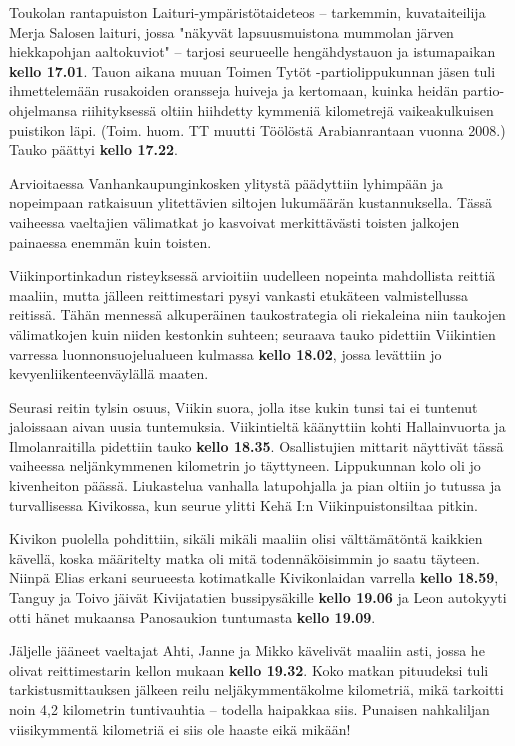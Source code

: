 \documentclass[10pt,finnish,a5paper,headings=small,twoside=semi]{scrartcl}
\begin{document}
\begin{multicols}{2}
	Toukolan rantapuiston Laituri-ympäristötaideteos – tarkemmin,
	kuvataiteilija Merja Salosen laituri, jossa "näkyvät lapsuusmuistona
	mummolan järven hiekkapohjan aaltokuviot" – tarjosi seurueelle
	hengähdystauon ja istumapaikan \textbf{kello 17.01}. Tauon aikana muuan
	Toimen Tytöt -partiolippukunnan jäsen tuli ihmettelemään rusakoiden
	oransseja huiveja ja kertomaan, kuinka heidän partio-ohjelmansa
	riihityksessä oltiin hiihdetty kymmeniä kilometrejä vaikeakulkuisen
	puistikon läpi. (Toim. huom. TT muutti Töölöstä Arabianrantaan vuonna
	2008.) Tauko päättyi \textbf{kello 17.22}.

	Arvioitaessa Vanhankaupunginkosken ylitystä päädyttiin lyhimpään ja
	nopeimpaan ratkaisuun ylitettävien siltojen lukumäärän kustannuksella.
	Tässä vaiheessa vaeltajien välimatkat jo kasvoivat merkittävästi
	toisten jalkojen painaessa enemmän kuin toisten.

	Viikinportinkadun risteyksessä arvioitiin uudelleen nopeinta
	mahdollista reittiä maaliin, mutta jälleen reittimestari pysyi vankasti
	etukäteen valmistellussa reitissä. Tähän mennessä alkuperäinen
	taukostrategia oli riekaleina niin taukojen välimatkojen kuin niiden
	kestonkin suhteen; seuraava tauko pidettiin Viikintien varressa
	luonnonsuojelualueen kulmassa \textbf{kello 18.02}, jossa levättiin jo
	kevyenliikenteenväylällä maaten.

	Seurasi reitin tylsin osuus, Viikin suora, jolla itse kukin tunsi tai
	ei tuntenut jaloissaan aivan uusia tuntemuksia. Viikintieltä käänyttiin
	kohti Hallainvuorta ja Ilmolanraitilla pidettiin tauko \textbf{kello
	18.35}. Osallistujien mittarit näyttivät tässä vaiheessa neljänkymmenen
	kilometrin jo täyttyneen. Lippukunnan kolo oli jo kivenheiton päässä.
	Liukastelua vanhalla latupohjalla ja pian oltiin jo tutussa ja
	turvallisessa Kivikossa, kun seurue ylitti Kehä I:n Viikinpuistonsiltaa
	pitkin.

	Kivikon puolella pohdittiin, sikäli mikäli maaliin olisi välttämätöntä
	kaikkien kävellä, koska määritelty matka oli mitä todennäköisimmin jo
	saatu täyteen. Niinpä Elias erkani seurueesta kotimatkalle
	Kivikonlaidan varrella \textbf{kello 18.59}, Tanguy ja Toivo jäivät
	Kivijatatien bussipysäkille \textbf{kello 19.06} ja Leon autokyyti otti
	hänet mukaansa Panosaukion tuntumasta \textbf{kello 19.09}.

	Jäljelle jääneet vaeltajat Ahti, Janne ja Mikko kävelivät maaliin asti,
	jossa he olivat reittimestarin kellon mukaan \textbf{kello 19.32}. Koko
	matkan pituudeksi tuli tarkistusmittauksen jälkeen reilu
	neljäkymmentäkolme kilometriä, mikä tarkoitti noin 4,2 kilometrin
	tuntivauhtia – todella haipakkaa siis. Punaisen nahkaliljan
	viisikymmentä kilometriä ei siis ole haaste eikä mikään!


\end{multicols}
\end{document}
